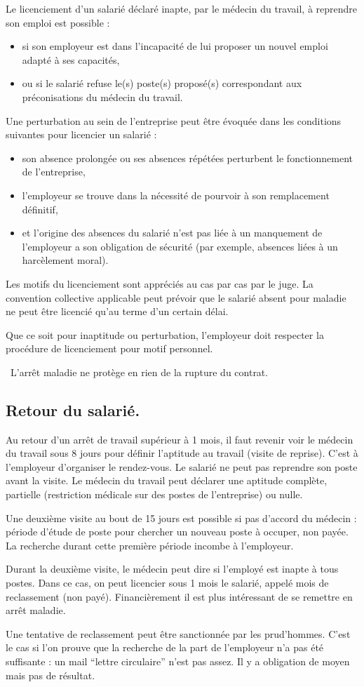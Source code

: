	Le licenciement d'un salarié déclaré inapte, par le médecin du travail, à reprendre son emploi est possible :
	\begin{itemize}
		\item[\textbullet] si son employeur est dans l’incapacité de lui proposer un nouvel emploi adapté à ses capacités,
		\item[\textbullet] ou si le salarié refuse le(s) poste(s) proposé(s) correspondant aux préconisations du médecin du travail.
	\end{itemize}

	Une perturbation au sein de l'entreprise peut être évoquée dans les conditions suivantes pour licencier un salarié :
	\begin{itemize}
		\item[\textbullet] son absence prolongée ou ses absences répétées perturbent le fonctionnement de l’entreprise,
		\item[\textbullet] l'employeur se trouve dans la nécessité de pourvoir à son remplacement définitif,
		\item[\textbullet] et l'origine des absences du salarié n'est pas liée à un manquement de l'employeur a son obligation de sécurité (par exemple, absences liées à un harcèlement moral).
	\end{itemize}

	Les motifs du licenciement sont appréciés au cas par cas par le juge.
	La convention collective applicable peut prévoir que le salarié absent pour maladie ne peut être licencié qu'au terme d’un certain délai.

	Que ce soit pour inaptitude ou perturbation, l'employeur doit respecter la procédure de licenciement pour motif personnel.

	\textrightarrow\ L'arrêt maladie ne protège en rien de la rupture du contrat.

\subsection{Retour du salarié.}
	Au retour d’un arrêt de travail supérieur à 1 mois, il faut revenir voir le médecin du travail sous 8 jours pour définir l’aptitude au travail (visite de reprise).
	C'est à l'employeur d'organiser le rendez-vous.
	Le salarié ne peut pas reprendre son poste avant la visite.
	Le médecin du travail peut déclarer une aptitude complète, partielle (restriction médicale sur des postes de l'entreprise) ou nulle.

	Une deuxième visite au bout de 15 jours est possible si pas d’accord du médecin : période d'étude de poste pour chercher un nouveau poste à occuper, non payée.
	La recherche durant cette première période incombe à l'employeur.
	
	Durant la deuxième visite, le médecin peut dire si l’employé est inapte à tous postes.
	Dans ce cas, on peut licencier sous 1 mois le salarié, appelé mois de reclassement (non payé).
	Financièrement il est plus intéressant de se remettre en arrêt maladie.
	
	Une tentative de reclassement peut être sanctionnée par les prud'hommes.
	C'est le cas si l'on prouve que la recherche de la part de l'employeur n'a pas été suffisante : un mail “lettre circulaire” n'est pas assez.
	Il y a obligation de moyen mais pas de résultat.